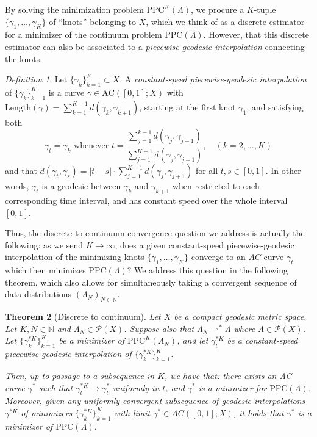 \documentclass[aos, preprint]{imsart}
\theoremstyle{plain}
\newtheorem{theorem}{Theorem}[section]
\theoremstyle{remark}
\newtheorem{defn}[theorem]{Definition}
\begin{document}
{By solving the minimization problem $\text{PPC}^{K}(\Lambda)$, we
procure a $K$-tuple $\{\gamma_{1},\ldots,\gamma_{K}\}$ of ``knots''
belonging to $X$, which we think of as a discrete estimator for a minimizer of the continuum problem $\text{PPC}(\Lambda)$. However, that this discrete estimator
can also be associated to a \emph{piecewise-geodesic interpolation}
connecting the knots.

\begin{defn}
\label{def:geodesic-interpolation}
Let $\{\gamma_k\}_{k=1}^K\subset X$. A \emph{constant-speed piecewise-geodesic interpolation} of $\{\gamma_k\}_{k=1}^K$ is a curve $\gamma\in\textrm{AC}([0,1];X)$ with $\textrm{Length}(\gamma)=\sum_{k=1}^{K-1}d(\gamma_k,\gamma_{k+1})$, starting at the first knot $\gamma_1$, and  satisfying both
\[
\gamma_{t}=\gamma_{k}\text{ whenever }t=\frac{\sum_{j=1}^{k-1}d(\gamma_{j},\gamma_{j+1})}{\sum_{j=1}^{K-1}d(\gamma_{j},\gamma_{j+1})},\quad(k=2,\ldots,K)
\]
and that $d(\gamma_{t},\gamma_{s})=|t-s|\cdot\sum_{j=1}^{K-1}d(\gamma_{j},\gamma_{j+1})$
for all $t,s\in[0,1]$. In other words, $\gamma_{t}$ is a geodesic
between $\gamma_{k}$ and $\gamma_{k+1}$ when restricted to each
corresponding time interval, and has constant speed over the whole
interval $[0,1]$.

\end{defn}

Thus, the discrete-to-continuum convergence question we address is
actually the following: as we send $K\rightarrow\infty$, does a given constant-speed
piecewise-geodesic interpolation of the minimizing knots
$\{\gamma_{1},\ldots,\gamma_{K}\}$ converge to an $AC$ curve
$\gamma_{t}$ which then minimizes $\text{PPC}(\Lambda)$? We address
this question in the following theorem, which also allows for
simultaneously taking a convergent sequence of data distributions
$(\Lambda_{N})_{N\in\mathbb{N}}$.

\begin{theorem}[Discrete to continuum]
\label{thm:discrete-to-continuum}
Let $X$ be a compact geodesic metric space. Let $K,N\in\mathbb{N}$ and
$\Lambda_{N}\in\mathcal{P}(X)$. Suppose also that
$\Lambda_{N}\rightharpoonup^{*}\Lambda$ where
$\Lambda\in\mathcal{P}(X)$. Let $\{\gamma_{k}^{*K}\}_{k=1}^{K}$ be a
minimizer of $\text{PPC}^{K}(\Lambda_{N})$, and let $\gamma^{*K}_t$ be a
constant-speed piecewise geodesic interpolation of
$\{\gamma_{k}^{*K}\}_{k=1}^{K}$.

Then, up to passage to a subsequence
in $K$, we have that: there exists an AC curve $\gamma^{*}$ such that
$\gamma_{t}^{*K}\rightarrow\gamma_{t}^{*}$ uniformly in
$t$, and $\gamma^{*}$ is a minimizer for $\text{PPC}(\Lambda)$.
Moreover, given any uniformly convergent subsequence of geodesic interpolations
$\gamma^{*K}$ of minimizers $\{\gamma_{k}^{*K}\}_{k=1}^{K}$ with limit
$\gamma^{*}\in AC([0,1];X)$, it holds that $\gamma^{*}$ is a minimizer
of $\text{PPC}(\Lambda)$.
\end{theorem}

}
\end{document}
